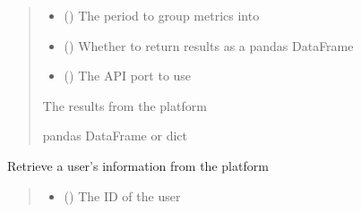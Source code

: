 \documentclass[letterpaper,10pt,english]{sphinxmanual}
\begin{document}
\begin{fulllineitems}
\begin{fulllineitems}
\begin{quote}
\begin{description}
\begin{itemize}
\item {} 
\sphinxAtStartPar
{} (\sphinxstyleliteralemphasis{\sphinxupquote{ (}}\sphinxstyleliteralemphasis{\sphinxupquote{)}}) \textendash{} The period to group metrics into

\item {} 
\sphinxAtStartPar
{} (\sphinxstyleliteralemphasis{\sphinxupquote{ (}}\sphinxstyleliteralemphasis{\sphinxupquote{)}}) \textendash{} Whether to return results as a pandas DataFrame

\item {} 
\sphinxAtStartPar
{} (\sphinxstyleliteralemphasis{\sphinxupquote{ (}}\sphinxstyleliteralemphasis{\sphinxupquote{)}}) \textendash{} The API port to use

\end{itemize}

\sphinxAtStartPar
{} \textendash{} The results from the platform

\sphinxAtStartPar
pandas DataFrame or dict

\end{description}\end{quote}

\end{fulllineitems}


\begin{fulllineitems}
\label{\detokenize{aisquared.platform:aisquared.platform.AISquaredPlatformClient.AISquaredPlatformClient.get_user}}
\pysigstartsignatures
{}
\pysigstopsignatures
\sphinxAtStartPar
Retrieve a user’s information from the platform
\begin{quote}\begin{description}
\begin{itemize}
\item {} 
\sphinxAtStartPar
{} () \textendash{} The ID of the user


\end{itemize}
\end{description}
\end{quote}
\end{fulllineitems}
\end{fulllineitems}
\end{document}
